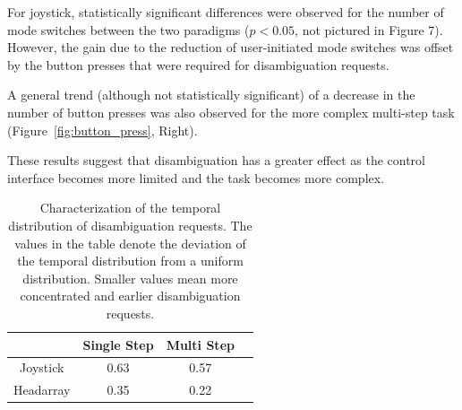 \documentclass[natbib, twocolumn]{svjour3}          %
\begin{document}
For joystick, statistically significant differences were observed for the number of mode switches between the two paradigms ($p < 0.05$, not pictured in Figure 7). However, the gain due to the reduction of user-initiated mode switches was offset by the button presses that were required for disambiguation requests. 

A general trend (although not statistically significant) of a decrease in the number of button presses was also observed for the more complex multi-step task (Figure~\ref{fig:button_press}, Right). 

These results suggest that disambiguation has a greater effect as the control interface becomes more limited and the task becomes more complex.
\begin{table}[t]
	\centering
	\caption{Characterization of the temporal distribution of disambiguation requests. The values in the table denote the deviation of the temporal distribution from a uniform distribution. Smaller values mean more concentrated and earlier disambiguation requests. } 
	\label{table:skewness}
	\begin{tabular}{|c|c|c|c|}
		\hline
		& Single Step & Multi Step \\
		\hline
		Joystick & 0.63 & 0.57 \\
		\hline
		Headarray & 0.35 & 0.22 \\
		\hline
	\end{tabular}
\end{table}
\end{document}
